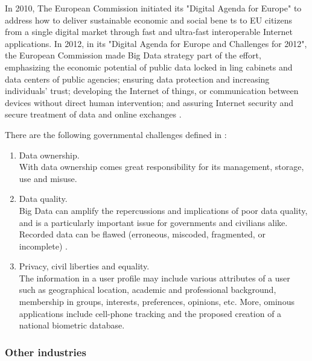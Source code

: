 \documentclass[runningheads]{llncs}
\begin{document}
In 2010, The European Commission initiated its "Digital Agenda for Europe" to address how to deliver sustainable economic and
social bene ts to EU citizens from a single digital market through fast and ultra-fast interoperable Internet applications. In 2012, in its "Digital Agenda for Europe and Challenges for 2012", the European Commission made Big Data strategy part of the effort, emphasizing the economic potential of public data locked in  ling cabinets and data centers of public agencies; ensuring data protection and increasing individuals' trust; developing the Internet of things, or communication between devices without direct human intervention; and assuring Internet security and secure treatment of data and online exchanges \cite{ACM}.

There are the following governmental challenges defined in \cite{MORABITO}:

\begin{enumerate}

\item Data ownership.\\

With data ownership comes great responsibility for its management, storage, use and misuse.\\

\item Data quality.\\

Big Data can amplify the repercussions and implications of poor data quality, and is a particularly important issue for governments and civilians alike. Recorded data can be flawed (erroneous, miscoded, fragmented, or incomplete) \cite{MORABITO}.\\

\item Privacy, civil liberties and equality.\\

The information in a user profile may include various attributes of a user such as geographical location, academic and professional background, membership in groups, interests, preferences, opinions, etc. More, ominous applications include cell-phone tracking and the proposed creation of a national biometric database.

\end{enumerate}

\subsubsection{Other industries}
\end{document}
